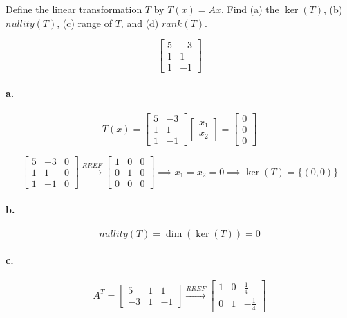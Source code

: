 \documentclass{report}
\begin{document}
\begin{tcolorbox}[colframe = lightred]
	Define the linear transformation $T$ by $T(x) = Ax$. Find (a) the $\ker(T)$, (b) $nullity(T)$, (c) range of $T$, and (d) $rank(T)$.
	
	$$
	\begin{bmatrix} 5 & -3 \\ 1 & 1 \\ 1 & -1 \end{bmatrix}
	$$
\end{tcolorbox}

\paragraph{a.} 

$$
T(x) = \begin{bmatrix} 5 & -3 \\ 1  & 1 \\ 1 & -1 \end{bmatrix} \begin{bmatrix} x_1 \\ x_2 \end{bmatrix} = \begin{bmatrix} 0 \\ 0 \\ 0 \end{bmatrix}
$$

$$
\begin{bmatrix}5 & -3 & 0 \\ 1 & 1 & 0 \\ 1 & -1 & 0 \end{bmatrix} \xrightarrow{RREF} \begin{bmatrix} 1 & 0 & 0 \\ 0 & 1 & 0 \\ 0 & 0 & 0 \end{bmatrix} \implies x_1 = x_2 = 0 \implies \ker(T) = \{ (0,0)\}
$$

\paragraph{b.} 

$$
nullity(T) = \dim(\ker(T)) = 0
$$

\paragraph{c.}

$$
A^T = \begin{bmatrix} 5 & 1 & 1 \\ -3 & 1 & -1  \end{bmatrix} \xrightarrow{RREF} \begin{bmatrix} 1 & 0 & \frac{1}{4} \\  0& 1 & -\frac{1}{4} \end{bmatrix}
$$
\end{document}
